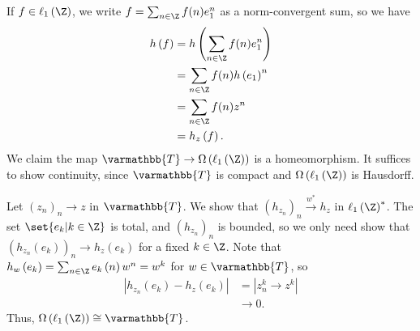 \documentclass[10pt]{mypackage}
\renewcommand*{\mathbb}[1]{\varmathbb{#1}}
\newcommand{\T}{\mathbb{T}}
\begin{document}
\begin{example}
  If $f\in \ell_1\left(\Z\right)$, we write $f = \sum_{n\in \Z}f(n)e^{n}_1$ as a norm-convergent sum, so we have
  \begin{align*}
    h\left(f\right) &= h\left(\sum_{n\in \Z}f(n)e_1^{n}\right)\\
                    &= \sum_{n\in \Z}f(n)h\left(e_1\right)^n\\
                    &= \sum_{n\in \Z}f(n)z^n\\
                    &= h_z\left(f\right).
  \end{align*}
  We claim the map $\T\rightarrow \Omega\left(\ell_1\left(\Z\right)\right)$ is a homeomorphism. It suffices to show continuity, since $\T$ is compact and $\Omega\left(\ell_1\left(\Z\right)\right)$ is Hausdorff.\newline

  Let $\left(z_n\right)_n\rightarrow z$ in $\T$. We show that $\left(h_{z_n}\right)_n\xrightarrow{w^{\ast}}h_{z}$ in $\ell_1\left(\Z\right)^{\ast}$. The set $\set{e_k | k\in \Z}$ is total, and $\left(h_{z_n}\right)_n$ is bounded, so we only need show that $\left(h_{z_n}\left(e_k\right)\right)_n\rightarrow h_{z}\left(e_k\right)$ for a fixed $k\in \Z$. Note that $h_w\left(e_k\right) = \sum_{n\in \Z}e_k\left(n\right)w^n = w^k$ for $w\in \T$, so
  \begin{align*}
    \left\vert h_{z_n}\left(e_k\right) - h_z\left(e_k\right) \right\vert &= \left\vert z_n^k\rightarrow z^k \right\vert\\
                                                                         &\rightarrow 0.
  \end{align*}
  Thus, $\Omega\left(\ell_1\left(\Z\right)\right)\cong \T$.
\end{example}
\end{document}
